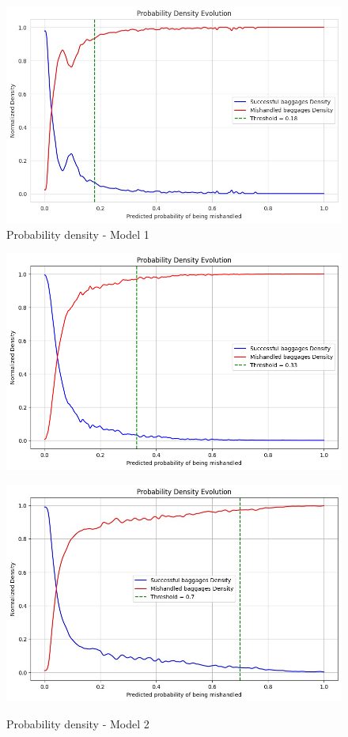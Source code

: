 \documentclass[12pt]{article}
\begin{document}
\FloatBarrier
\begin{figure}
\begin{minipage}[c]{0.5\linewidth}
    \includegraphics[width=1\textwidth]{Probability_density_Model 1.jpg}\\
    \caption{Probability density - Model 1}
    \label{fig:Probability_density_Model 1}
\end{minipage}
\hfill
\begin{minipage}[c]{0.5\linewidth}
    \includegraphics[width=1\textwidth]{Probability_density_Model 2.png}\\
    \caption{Probability density - Model 2}
\end{minipage}%
\break
\begin{minipage}[c]{0.5\linewidth}
    \includegraphics[width=1\textwidth]{Probability_density_Model 3.jpg}\\

\end{minipage}
\end{figure}
\end{document}
